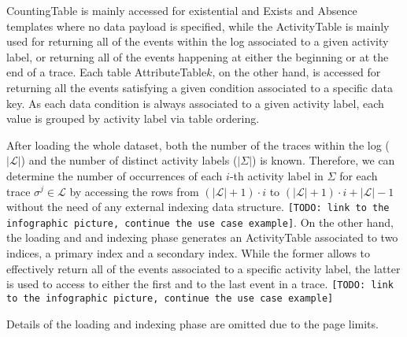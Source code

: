 \textsf{CountingTable} is mainly accessed for existential and \textsf{Exists} and \textsf{Absence} templates where no data payload is specified, while the \textsf{ActivityTable} is mainly used for returning all of the events within the log associated to a given activity label, or returning all of the events happening at either the beginning or at the end of a trace. Each table \textsf{AttributeTable$k$}, on the other hand, is accessed for returning all the events satisfying a given condition associated to a specific data key. As each data condition is always associated to a given activity label, each value is grouped by activity label via table ordering.

After loading the whole dataset, both the number of the traces within the log ($|\mathcal{L}|$) and the number of distinct activity labels ($|\Sigma|$) is known. Therefore, we can determine the number of occurrences of each $i$-th activity label in $\Sigma$ for each trace $\sigma^j\in\mathcal{L}$ by accessing the rows from $(|\mathcal{L}|+1)\cdot i$ to $(|\mathcal{L}|+1)\cdot i+
|\mathcal{L}|-1$ without the need of any external indexing data structure. \texttt{\color{red}[TODO: link to the infographic picture, continue the use case example]}. On the other hand, the loading and and indexing phase generates an \textsf{ActivityTable} associated to two indices, a primary index and a secondary index. While the former allows to effectively return all of the events associated to a specific activity label, the latter is used to access to either the first and to the last event in a trace.  \texttt{\color{red}[TODO: link to the infographic picture, continue the use case example]}

Details of the loading and indexing phase are omitted due to the page limits.



